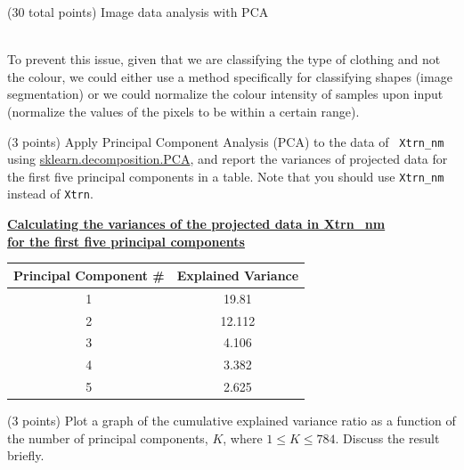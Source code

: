 \documentclass[12pt]{article}
\begin{document}
\begin{question}{(30 total points) Image data analysis with PCA}
\begin{subquestion}
\begin{answerbox}{52em}
{\\
    To prevent this issue, given that we are classifying the type of clothing and not the colour, we could either use a method specifically for classifying shapes (image segmentation) or we could normalize the colour intensity of samples upon input (normalize the values of the pixels to be within a certain range).}
  \end{answerbox}



   \end{subquestion}

   \begin{subquestion}{(3 points)
       Apply Principal Component Analysis (PCA) to the data of {\tt
         Xtrn\_nm} using \href{https://scikit-learn.org/0.19/modules/generated/sklearn.decomposition.PCA.html}{sklearn.decomposition.PCA}, and report the variances of projected data for the first five principal components in a table.
        Note that you should use {\tt Xtrn\_nm} instead of {\tt Xtrn}.
     } \label{Q1.pca.variance}



    \begin{answerbox}{15em}
        \begin{center}
        \textbf{\underline{Calculating the variances of the projected data in Xtrn\_nm}}\\
        \textbf{\underline{for the first five principal components}}\\
        \vspace{0.5cm}
        \footnotesize{
        \begin{tabular}{ |c|c| } \hline
        \textbf{Principal Component \#} & \textbf{Explained Variance} \\ \hline
        1 & 19.81 \\
        2 & 12.112 \\
        3 & 4.106 \\
        4 & 3.382 \\
        5 & 2.625 \\\hline
        \end{tabular}
        }
        \end{center}
    \end{answerbox}
    


   \end{subquestion}

   \begin{subquestion}{(3 points)
       Plot a graph of the cumulative explained variance ratio as a function of the number of principal components, $K$, where $1\le K \le 784$.
       Discuss the result briefly.
     } \label{Q1.plot.pca.variance}
   


\end{subquestion}
\end{question}
\end{document}
